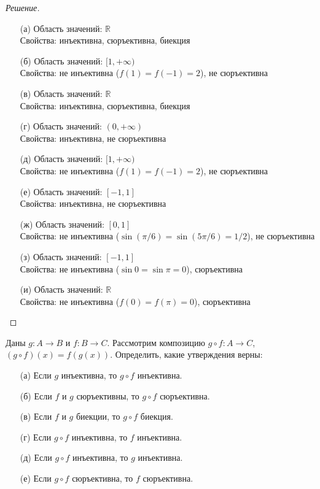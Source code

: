 \documentclass{article}
\begin{document}
\begin{proof}[Решение]\
\begin{enumerate}
    \item[(а)] Область значений: $\mathbb{R}$ \\
     Свойства: инъективна, сюръективна, биекция
    
    \item[(б)] Область значений: $[1, +\infty)$ \\
     Свойства: не инъективна ($f(1) = f(-1) = 2$), не сюръективна 
    
    \item[(в)] Область значений: $\mathbb{R}$ \\
     Свойства: инъективна, сюръективна, биекция
    
    \item[(г)] Область значений: $(0, +\infty)$ \\
     Свойства: инъективна, не сюръективна
    
    \item[(д)] Область значений: $[1, +\infty)$ \\
    Свойства: не инъективна ($f(1) = f(-1) = 2$), не сюръективна
    
    \item[(е)] Область значений: $[-1, 1]$ \\
    Свойства: инъективна, не сюръективна
    
    \item[(ж)] Область значений: $[0, 1]$ \\
    Свойства: не инъективна ($\sin(\pi/6) = \sin(5\pi/6) = 1/2$), не сюръективна
    
    \item[(з)] Область значений: $[-1, 1]$ \\
    Свойства: не инъективна ($\sin 0 = \sin \pi = 0$), сюръективна
    
    \item[(и)] Область значений: $\mathbb{R}$ \\
    Свойства: не инъективна ($f(0) = f(\pi) = 0$), сюръективна
\end{enumerate}
\end{proof}

\begin{task}[2]
Даны $g : A \to B$ и $f : B \to C$. Рассмотрим композицию $g\circ f : A \to C$, $(g\circ f)(x)=f(g(x))$. Определить, какие утверждения верны:
\begin{enumerate}
    \item[(а)] Если $g$ инъективна, то $g\circ f$ инъективна.
    \item[(б)] Если $f$ и $g$ сюръективны, то $g\circ f$ сюръективна.
    \item[(в)] Если $f$ и $g$ биекции, то $g\circ f$ биекция.
    \item[(г)] Если $g\circ f$ инъективна, то $f$ инъективна.
    \item[(д)] Если $g\circ f$ инъективна, то $g$ инъективна.
    \item[(е)] Если $g\circ f$ сюръективна, то $f$ сюръективна.
\end{enumerate}
\end{task}
\end{document}
